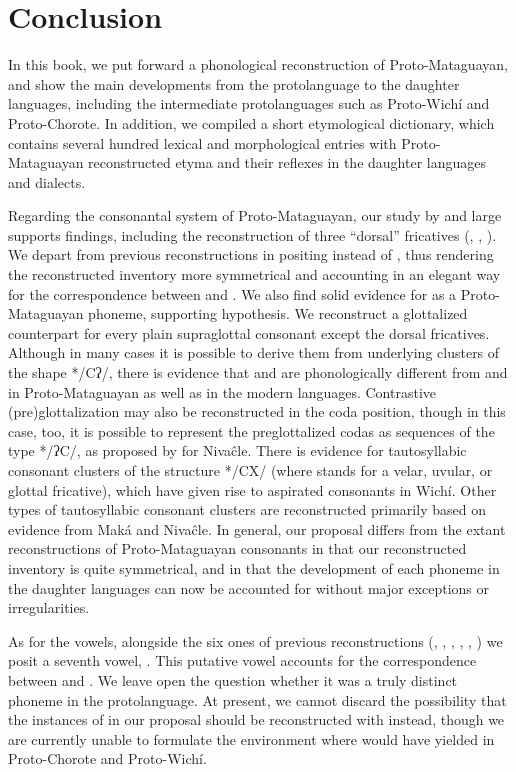 \chapter{Conclusion}\label{concl}

In this book, we put forward a phonological reconstruction of Proto-Mataguayan, and show the main developments from the protolanguage to the daughter languages, including the intermediate protolanguages such as Proto-Wichí and Proto-Chorote. In addition, we compiled a short etymological dictionary, which contains several hundred lexical and morphological entries with Proto-Mataguayan reconstructed etyma and their reflexes in the daughter languages and dialects.

Regarding the consonantal system of Proto-Mataguayan, our study by and large supports  findings, including the reconstruction of three ``dorsal'' fricatives (, , ). We depart from previous reconstructions in positing  instead of , thus rendering the reconstructed inventory more symmetrical and accounting in an elegant way for the correspondence between  and . We also find solid evidence for  as a Proto-Mataguayan phoneme, supporting  hypothesis. We reconstruct a glottalized counterpart for every plain supraglottal consonant except the dorsal fricatives. Although in many cases it is possible to derive them from underlying clusters of the shape */Cʔ/, there is evidence that  and  are phonologically different from  and  in Proto-Mataguayan as well as in the modern languages. Contrastive (pre)glottalization may also be reconstructed in the coda position, though in this case, too, it is possible to represent the preglottalized codas as sequences of the type */ʔC/, as proposed by \citet{AnG16b} for Nivaĉle. There is evidence for tautosyllabic consonant clusters of the structure */CX/ (where  stands for a velar, uvular, or glottal fricative), which have given rise to aspirated consonants in Wichí. Other types of tautosyllabic consonant clusters are reconstructed primarily based on evidence from Maká and Nivaĉle. In general, our proposal differs from the extant reconstructions of Proto-Mataguayan consonants in that our reconstructed inventory is quite symmetrical, and in that the development of each phoneme in the daughter languages can now be accounted for without major exceptions or irregularities.

As for the vowels, alongside the six ones of previous reconstructions (, , , , , ) we posit a seventh vowel, . This putative vowel accounts for the correspondence between  and . We leave open the question whether it was a truly distinct phoneme in the protolanguage. At present, we cannot discard the possibility that the instances of  in our proposal should be reconstructed with  instead, though we are currently unable to formulate the environment where  would have yielded  in Proto-Chorote and Proto-Wichí.

